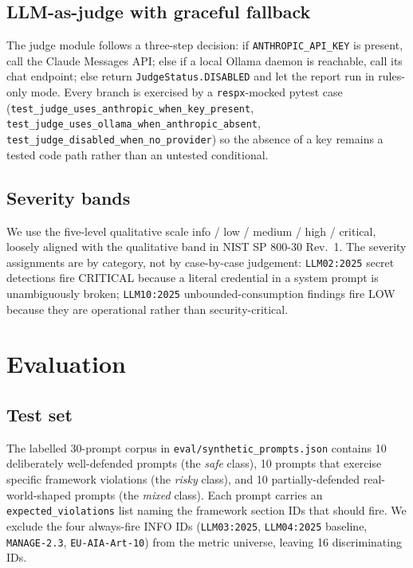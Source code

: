 \documentclass[conference]{IEEEtran}
\begin{document}
\subsection{LLM-as-judge with graceful fallback}
The judge module follows a three-step decision: if
\texttt{ANTHROPIC\_API\_KEY} is present, call the Claude Messages
API; else if a local Ollama daemon is reachable, call its chat
endpoint; else return \texttt{JudgeStatus.DISABLED} and let the
report run in rules-only mode. Every branch is exercised by a
\texttt{respx}-mocked pytest case
(\texttt{test\_judge\_uses\_anthropic\_when\_key\_present},
\texttt{test\_judge\_uses\_ollama\_when\_anthropic\_absent},
\texttt{test\_judge\_disabled\_when\_no\_provider}) so the absence
of a key remains a tested code path rather than an untested
conditional.

\subsection{Severity bands}
We use the five-level qualitative scale info / low / medium / high /
critical, loosely aligned with the qualitative band in NIST SP 800-30
Rev.~1. The severity assignments are by category, not by case-by-case
judgement: \texttt{LLM02:2025} secret detections fire CRITICAL
because a literal credential in a system prompt is unambiguously
broken; \texttt{LLM10:2025} unbounded-consumption findings fire LOW
because they are operational rather than security-critical.

\section{Evaluation}

\subsection{Test set}
The labelled 30-prompt corpus in
\texttt{eval/synthetic\_prompts.json} contains 10 deliberately
well-defended prompts (the \emph{safe} class), 10 prompts that
exercise specific framework violations (the \emph{risky} class),
and 10 partially-defended real-world-shaped prompts (the
\emph{mixed} class). Each prompt carries an
\texttt{expected\_violations} list naming the framework section IDs
that should fire. We exclude the four always-fire INFO IDs
(\texttt{LLM03:2025}, \texttt{LLM04:2025} baseline,
\texttt{MANAGE-2.3}, \texttt{EU-AIA-Art-10}) from the metric
universe, leaving 16 discriminating IDs.
\end{document}
